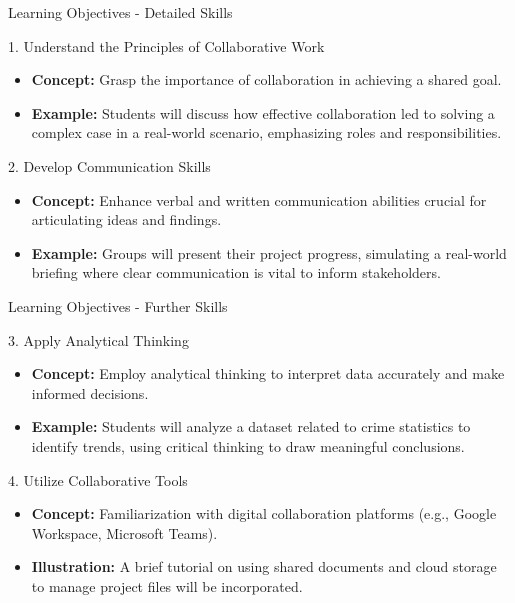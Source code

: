 \documentclass[aspectratio=169]{beamer}
\begin{document}
\begin{frame}[fragile]{Learning Objectives - Detailed Skills}
    \begin{block}{1. Understand the Principles of Collaborative Work}
        \begin{itemize}
            \item \textbf{Concept:} Grasp the importance of collaboration in achieving a shared goal.
            \item \textbf{Example:} Students will discuss how effective collaboration led to solving a complex case in a real-world scenario, emphasizing roles and responsibilities.
        \end{itemize}
    \end{block}

    \begin{block}{2. Develop Communication Skills}
        \begin{itemize}
            \item \textbf{Concept:} Enhance verbal and written communication abilities crucial for articulating ideas and findings.
            \item \textbf{Example:} Groups will present their project progress, simulating a real-world briefing where clear communication is vital to inform stakeholders.
        \end{itemize}
    \end{block}
\end{frame}

\begin{frame}[fragile]{Learning Objectives - Further Skills}
    \begin{block}{3. Apply Analytical Thinking}
        \begin{itemize}
            \item \textbf{Concept:} Employ analytical thinking to interpret data accurately and make informed decisions.
            \item \textbf{Example:} Students will analyze a dataset related to crime statistics to identify trends, using critical thinking to draw meaningful conclusions.
        \end{itemize}
    \end{block}

    \begin{block}{4. Utilize Collaborative Tools}
        \begin{itemize}
            \item \textbf{Concept:} Familiarization with digital collaboration platforms (e.g., Google Workspace, Microsoft Teams).
            \item \textbf{Illustration:} A brief tutorial on using shared documents and cloud storage to manage project files will be incorporated.
        \end{itemize}
    \end{block}
\end{frame}
\end{document}
